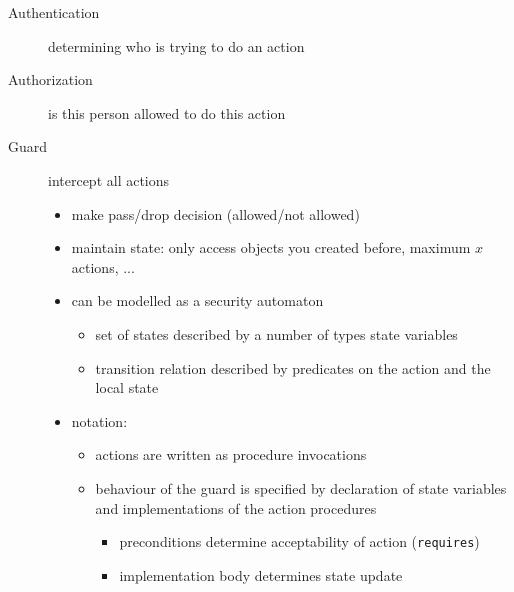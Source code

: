 \documentclass[12pt,titlepage,a4paper]{report}
\begin{document}
	\begin{description}
		\item[Authentication] determining who is trying to do an action
		\item[Authorization] is this person allowed to do this action
		\item[Guard] intercept all actions
		\begin{itemize}
			\item make pass/drop decision (allowed/not allowed)
			\item maintain state: only access objects you created before, maximum $x$ actions, ...
			\item can be modelled as a security automaton
			\begin{itemize}
				\item set of states described by a number of types state variables
				\item transition relation described by predicates on the action and the local state
			\end{itemize}
			\item notation:
			\begin{itemize}
				\item actions are written as procedure invocations
				\item behaviour of the guard is specified by declaration of state variables and implementations of the action procedures
				\begin{itemize}
					\item preconditions determine acceptability of action (\texttt{requires})
					\item implementation body determines state update
				\end{itemize}
			\end{itemize}
		\end{itemize}
	\end{description}
\end{document}

